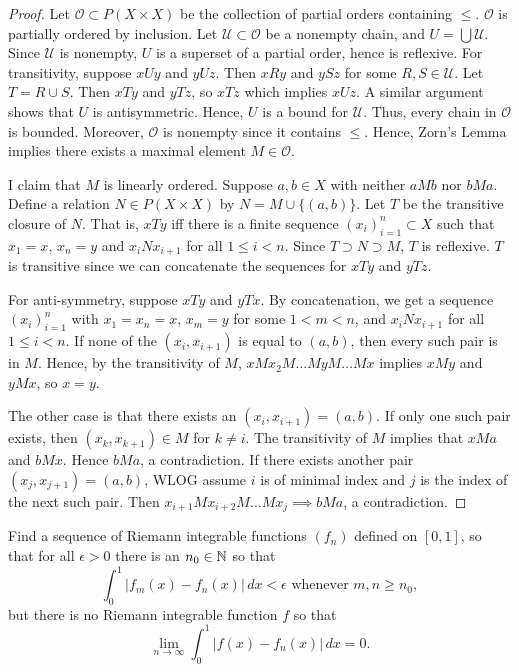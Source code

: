 \documentclass{article}
\begin{document}
\begin{proof}

Let $\mathcal O \subset P(X \times X)$ be the collection of partial orders containing $\le$. $\mathcal O$ is partially ordered by inclusion.  Let $\mathcal U \subset \mathcal O$ be a nonempty chain, and $U = \bigcup \mathcal U$.  Since $\mathcal U$ is nonempty, $U$ is a superset of a partial order, hence is reflexive. For transitivity, suppose $xUy$ and $yUz$.  Then $xRy$ and $ySz$ for some $R,S \in \mathcal U$. Let $T = R \cup S$.  Then $xTy$ and $yTz$, so $xTz$ which implies $xUz$.  A similar argument shows that $U$ is antisymmetric. Hence, $U$ is a bound for $\mathcal U$. Thus, every chain in $\mathcal O$ is bounded. Moreover, $\mathcal O$ is nonempty since it contains $\le$. Hence, Zorn's Lemma implies there exists a maximal element $M \in \mathcal O$. 

I claim that $M$ is linearly ordered.  Suppose $a,b \in X$ with neither $aMb$ nor $bMa$.  Define a relation $N \in P(X \times X)$ by $N = M \cup \{(a,b)\}$.  Let $T$ be the transitive closure of $N$. That is, $xTy$ iff there is a finite sequence $(x_i)_{i=1}^n \subset X$ such that $x_1 = x$, $x_n = y$ and $x_iNx_{i+1}$ for all $1 \le i < n$. Since $T \supset N \supset M$, $T$ is reflexive.  $T$ is transitive since we can concatenate the sequences for $xTy$ and $yTz$. 

For anti-symmetry, suppose $xTy$ and $yTx$.  By concatenation, we get a sequence $(x_i)_{i=1}^n$ with $x_1 = x_n = x$, $x_m = y$ for some $1<m<n$, and $x_iNx_{i+1}$ for all $1 \le i < n$. If none of the $(x_i,x_{i+1})$ is equal to $(a,b)$, then every such pair is in $M$.  Hence, by the transitivity of $M$, $x M x_2 M \ldots M y M \ldots M x$ implies $x M y$ and $y M x$, so $x = y$.  

The other case is that there exists an $(x_i,x_{i+1}) = (a,b)$.  If only one such pair exists, then $(x_k,x_{k+1}) \in M$ for $k \neq i$.  The transitivity of $M$ implies that $xMa$ and $bMx$. Hence $bMa$, a contradiction.  If there exists another pair $(x_j, x_{j+1}) = (a,b)$, WLOG assume $i$ is of minimal index and $j$ is the index of the next such pair.  Then $x_{i+1} M x_{i+2} M \ldots M x_j \implies b M a$, a contradiction.
\end{proof}

 Find a sequence of Riemann integrable functions $(f_n)$ defined on $[0,1]$, so that for all $\epsilon > 0$ there is an $n_0 \in \mathbb{N}$ so that
$$ \int_0^1 |f_m(x) - f_n(x)| \,dx < \epsilon \text{ whenever } m,n \ge n_0, $$
but there is no Riemann integrable function $f$ so that
$$\lim_{n\to \infty} \int_0^1 |f(x) - f_n(x)| \,dx = 0. $$
\end{document}
